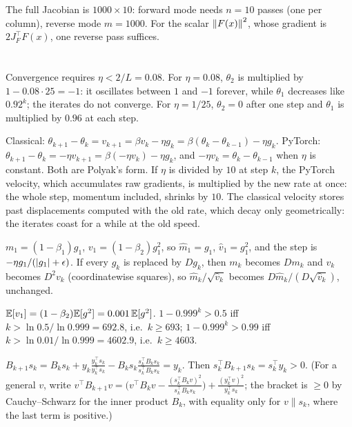 The full Jacobian is $1000\times10$: forward mode needs $n = 10$ passes (one per column), reverse mode $m = 1000$.
For the scalar $\left\|F(x)\right\|^2$, whose gradient is $2J_F^\top F(x)$, one reverse pass suffices.

\section{}

Convergence requires $\eta<2/L = 0.08$. For $\eta = 0.08$, $\theta_2$ is multiplied by $1 - 0.08\cdot25 = -1$: it oscillates between
$1$ and $-1$ forever, while $\theta_1$ decreases like $0.92^k$; the iterates do not converge. For $\eta = 1/25$, $\theta_2 = 0$
after one step and $\theta_1$ is multiplied by $0.96$ at each step.

Classical: $\theta_{k+1} - \theta_k = v_{k+1} = \beta v_k - \eta g_k = \beta(\theta_k - \theta_{k-1}) - \eta g_k$. PyTorch: $\theta_{k+1} - \theta_k = -\eta v_{k+1} = \beta(-\eta v_k) - \eta g_k$, and
$-\eta v_k = \theta_k - \theta_{k-1}$ when $\eta$ is constant. Both are Polyak's form. If $\eta$ is divided by $10$ at step $k$, the
PyTorch velocity, which accumulates raw gradients, is multiplied by the new rate at once: the
whole step, momentum included, shrinks by $10$. The classical velocity stores past
displacements computed with the old rate, which decay only geometrically: the iterates
coast for a while at the old speed.

$m_1 = (1 - \beta_1)g_1$, $v_1 = (1 - \beta_2)g_1^2$, so $\hat m_1 = g_1$, $\hat v_1 = g_1^2$, and the step is $-\eta g_1/(\left|g_1\right| + \epsilon)$. If every $g_k$
is replaced by $Dg_k$, then $m_k$ becomes $Dm_k$ and $v_k$ becomes $D^2v_k$ (coordinatewise squares), so
$\hat m_k/\sqrt{\hat v_k}$ becomes $D\hat m_k/(D\sqrt{\hat v_k})$, unchanged.

$\mathbb{E}[v_1] = (1 - \beta_2)\mathbb{E}[g^2] = 0.001\,\mathbb{E}[g^2]$. $1 - 0.999^k>0.5$ iff $k>\ln0.5/\ln0.999 = 692.8$, i.e.\ $k\geq693$; $1 - 0.999^k>0.99$ iff
$k>\ln0.01/\ln0.999 = 4602.9$, i.e.\ $k\geq4603$.

$B_{k+1}s_k = B_ks_k + y_k\frac{y_k^\top s_k}{y_k^\top s_k} - B_ks_k\frac{s_k^\top B_ks_k}{s_k^\top B_ks_k} = y_k$. Then $s_k^\top B_{k+1}s_k = s_k^\top y_k>0$. (For a general $v$, write
$v^\top B_{k+1}v = \bigl(v^\top B_kv - \frac{(s_k^\top B_kv)^2}{s_k^\top B_ks_k}\bigr) + \frac{(y_k^\top v)^2}{y_k^\top s_k}$; the bracket is $\geq0$ by Cauchy--Schwarz for the inner product
$B_k$, with equality only for $v\parallel s_k$, where the last term is positive.)

